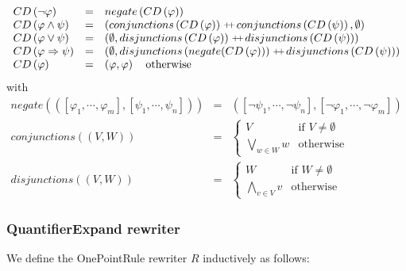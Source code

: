 \begin{equation*}
\begin{array}{lll}
CD\left( \lnot \varphi \right) & = & negate\left( CD\left( \varphi \right)
\right) \\ 
CD\left( \varphi \wedge \psi \right) & = & \left( conjunctions\left(
CD\left( \varphi \right) \right) \concat conjunctions\left( CD\left( \psi
\right) \right) ,\emptyset \right) \\ 
CD\left( \varphi \vee \psi \right) & = & \left( \emptyset
,disjunctions\left( CD\left( \varphi \right) \right) \concat %
disjunctions\left( CD\left( \psi \right) \right) \right) \\ 
CD\left( \varphi \Rightarrow \psi \right) & = & \left( \emptyset
,disjunctions\left( negate(CD\left( \varphi \right) )\right) \concat %
disjunctions\left( CD\left( \psi \right) \right) \right) \\ 
CD\left( \varphi \right) & = & \left( \varphi ,\varphi \right) \text{
otherwise}%
\end{array}%
\end{equation*}%
with%
\begin{equation*}
\begin{array}{lll}
negate\left( \left( \left[ \varphi _{1},\cdots ,\varphi _{m}\right] ,\left[
\psi _{1},\cdots ,\psi _{n}\right] \right) \right) & = & \left( \left[ \lnot
\psi _{1},\cdots ,\lnot \psi _{n}\right] ,\left[ \lnot \varphi _{1},\cdots
,\lnot \varphi _{m}\right] \right) \\ 
conjunctions\left( \left( V,W\right) \right) & = & \left\{ 
\begin{array}{ll}
V & \text{if }V\neq \emptyset \\ 
\bigvee\limits_{w\in W}w & \text{otherwise}%
\end{array}%
\right. \\ 
disjunctions\left( \left( V,W\right) \right) & = & \left\{ 
\begin{array}{ll}
W & \text{if }W\neq \emptyset \\ 
\bigwedge\limits_{v\in V}v & \text{otherwise}%
\end{array}%
\right.%
\end{array}%
\end{equation*}

\subsubsection{QuantifierExpand rewriter}

We define the OnePointRule rewriter $R$ inductively as follows:

